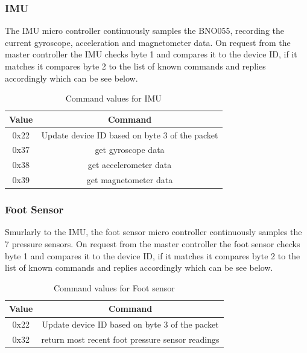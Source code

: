         \subsubsection{IMU}
            The IMU micro controller continuously samples the BNO055, recording the current gyroscope, acceleration and magnetometer data. On request from the master controller the IMU checks byte 1 and compares it to the device ID, if it matches it compares byte 2 to the list of known commands and replies accordingly which can be see below.
            \begin{table}[H]
                \centering
                \begin{tabular}{|c|c|}
                \hline
                    Value & Command \\
                    \hline
                    0x22 & Update device ID based on byte 3 of the packet\\
                    0x37 & get gyroscope data\\
                    0x38 & get accelerometer data\\
                    0x39 & get magnetometer data\\
                    \hline
                    \end{tabular}
                \caption{Command values for IMU}
                \label{tab:IMUCommandValues}
            \end{table}

        \subsubsection{Foot Sensor}
            Smurlarly to the IMU, the foot sensor micro controller continuously samples the 7 pressure sensors. On request from the master controller the foot sensor checks byte 1 and compares it to the device ID, if it matches it compares byte 2 to the list of known commands and replies accordingly which can be see below.
            \begin{table}[H]
                \centering
                \begin{tabular}{|c|c|}
                \hline
                    Value & Command \\
                    \hline
                    0x22 & Update device ID based on byte 3 of the packet\\
                    0x32 & return most recent foot pressure sensor readings\\
                    \hline
                    \end{tabular}
                \caption{Command values for Foot sensor}
                \label{tab:FootSensorCommandValues}
            \end{table}
